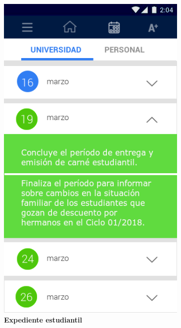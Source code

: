 \documentclass[12pt]{article}
\begin{document}
\begin{figure}[t]
\begin{minipage}[t]{0.45\textwidth}
		\includegraphics[width=0.825\textwidth]{img/7.png}
	\end{minipage}
	\begin{minipage}[t]{0.45\textwidth}
		\centering
		\caption{\textbf{Expediente estudiantil}}

\end{minipage}
\end{figure}
\end{document}
